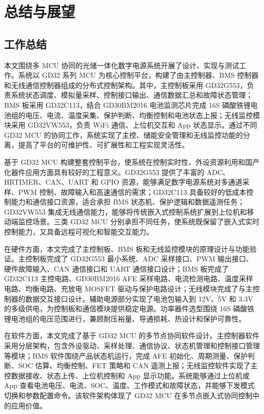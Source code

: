 ﻿%

\section{总结与展望}

\subsection{工作总结}

本文围绕多 MCU 协同的光储一体化数字电源系统开展了设计、实现与测试工作。系统以 GD32 系列 MCU 为核心控制平台，构建了由主控制器、BMS 控制器和无线通信控制器组成的分布式控制架构。其中，主控制板采用 GD32G553，负责系统状态调度、模拟量采样、控制接口输出、通信数据汇总和故障状态管理；BMS 板采用 GD32C113，结合 GD30BM2016 电池监测芯片完成 16S 磷酸铁锂电池组的电压、电流、温度采集、保护判断、均衡控制和电池状态上报；无线监控模块采用 GD32VW553，负责 WiFi 通信、上位机交互和 App 状态显示。通过不同 GD32 MCU 的协同工作，系统实现了主控、储能安全管理和无线监控功能的分离，提高了平台的可维护性、可扩展性和工程实现灵活性。

基于 GD32 MCU 构建整套控制平台，使系统在控制实时性、外设资源利用和国产化器件应用方面具有较好的工程意义。GD32G553 提供了丰富的 ADC、HRTIMER、CAN、UART 和 GPIO 资源，能够满足数字电源系统对多通道采样、PWM 控制、故障输入和高速通信的需求；GD32C113 具备较好的低成本控制能力和通信接口资源，适合承担 BMS 状态机、保护逻辑和数据遥测任务；GD32VW553 集成无线通信能力，能够将传统嵌入式控制系统扩展到上位机和移动端监控场景。三类 GD32 MCU 分别承担不同任务，使系统既保留了嵌入式实时控制能力，又具备远程可视化和智能交互能力。

在硬件方面，本文完成了主控制板、BMS 板和无线监控模块的原理设计与功能验证。主控制板完成了 GD32G553 最小系统、ADC 采样接口、PWM 输出接口、硬件故障输入、CAN 通信接口和 UART 通信接口设计；BMS 板完成了 GD32C113 主控电路、GD30BM2016 AFE 采样电路、电流检测电路、温度采样电路、均衡电路、充放电 MOSFET 驱动与保护电路设计；无线模块完成了与主控制器的数据交互接口设计。辅助电源部分实现了电池包输入到 12V、5V 和 3.3V 的多级供电，为控制板和通信模块提供稳定电源。功率器件选型围绕 16S 磷酸铁锂电池组的电压范围进行，兼顾耐压裕量、导通损耗、热设计和保护可靠性。

在软件方面，本文完成了基于 GD32 MCU 的多节点协同软件设计。主控制器软件采用分层架构，包含外设驱动、采样处理、通信协议、状态机管理和控制接口管理等模块；BMS 软件围绕产品状态机运行，完成 AFE 初始化、周期测量、保护判断、SOC 估算、均衡控制、FET 策略和 CAN 遥测上报；无线监控软件实现了主控数据接收、状态上传、上位机控制和 App 显示功能。系统能够通过上位机或 App 查看电池电压、电流、SOC、温度、工作模式和故障状态，并能够下发模式切换和参数配置命令。该软件架构体现了 GD32 MCU 在多节点嵌入式协同控制中的应用价值。

